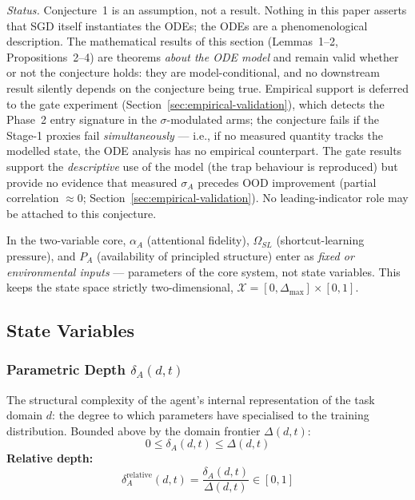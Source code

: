 \documentclass{article}
\theoremstyle{definition}
\begin{document}
\noindent\emph{Status.} Conjecture~1 is an assumption, not a result.
Nothing in this paper asserts that SGD itself instantiates the ODEs; the
ODEs are a phenomenological description. The mathematical results of
this section (Lemmas~1--2, Propositions~2--4) are theorems \emph{about
the ODE model} and remain valid whether or not the conjecture holds:
they are model-conditional, and no downstream result silently depends on
the conjecture being true. Empirical support is deferred to the gate
experiment (Section~\ref{sec:empirical-validation}), which detects the
Phase~2 entry signature in the $\sigma$-modulated arms; the conjecture
fails if the Stage-1 proxies fail \emph{simultaneously} --- i.e., if no
measured quantity tracks the modelled state, the ODE analysis has no
empirical counterpart. The gate results support the \emph{descriptive}
use of the model (the trap behaviour is reproduced) but provide no
evidence that measured $\sigma_A$ precedes OOD improvement (partial
correlation $\approx 0$; Section~\ref{sec:empirical-validation}). No
leading-indicator role may be attached to this conjecture.

\noindent In the two-variable core, $\alpha_A$ (attentional fidelity),
$\Omega_{SL}$ (shortcut-learning pressure), and $P_A$ (availability of
principled structure) enter as \emph{fixed or environmental inputs} ---
parameters of the core system, not state variables. This keeps the state space strictly
two-dimensional, $\mathcal{X} = [0, \Delta_{\max}] \times [0, 1]$.

\subsection{State Variables}\label{sec:state-variables}

\subsubsection{Parametric Depth \texorpdfstring{$\delta_A(d,t)$}{delta\_A(d,t)}}\label{sec:depth}

The structural complexity of the agent's internal representation of the
task domain $d$: the degree to which parameters have specialised to the
training distribution. Bounded above by the domain frontier
$\Delta(d,t)$:
\begin{equation}\label{eq:depth-bounds}
0 \leq \delta_A(d,t) \leq \Delta(d,t)
\end{equation}
\textbf{Relative depth:}
\begin{equation}\label{eq:relative-depth}
\delta_A^{\text{relative}}(d,t) = \frac{\delta_A(d,t)}{\Delta(d,t)} \in [0,1]
\end{equation}
\end{document}
